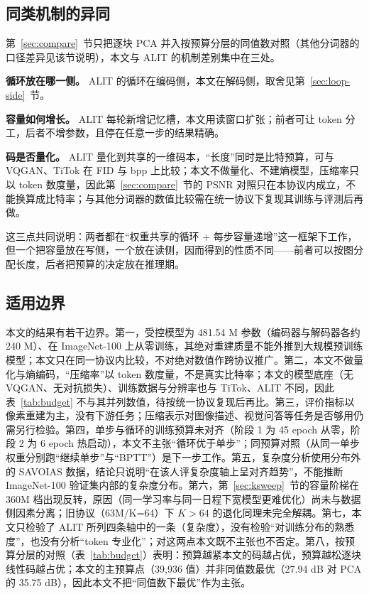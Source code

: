 \subsection{\heiti 同类机制的异同}
\label{sec:alit}

第~\ref{sec:compare}~节只把逐块 PCA 并入按预算分层的同值数对照（其他分词器的口径差异见该节说明），本文与 ALIT 的机制差别集中在三处。

\textbf{循环放在哪一侧。} ALIT 的循环在编码侧，本文在解码侧，取舍见第~\ref{sec:loop-side}~节。

\textbf{容量如何增长。} ALIT 每轮新增记忆槽，本文用读窗口扩张；前者可让 token 分工，后者不增参数，且停在任意一步的结果精确。

\textbf{码是否量化。} ALIT 量化到共享的一维码本，“长度”同时是比特预算，可与 VQGAN、TiTok 在 FID 与 bpp 上比较；本文不做量化、不建熵模型，压缩率只以 token 数度量，因此第~\ref{sec:compare}~节的 PSNR 对照只在本协议内成立，不能换算成比特率；与其他分词器的数值比较需在统一协议下复现其训练与评测后再做。

这三点共同说明：两者都在“权重共享的循环 + 每步容量递增”这一框架下工作，但一个把容量放在写侧，一个放在读侧，因而得到的性质不同——前者可以按图分配长度，后者把预算的决定放在推理期。

\subsection{\heiti 适用边界}
\label{sec:limitation}

本文的结果有若干边界。第一，受控模型为 481.54 M 参数（编码器与解码器各约 240 M）、在 ImageNet-100 上从零训练，其绝对重建质量不能外推到大规模预训练模型；本文只在同一协议内比较，不对绝对数值作跨协议推广。第二，本文不做量化与熵编码，“压缩率”以 token 数度量，不是真实比特率；本文的模型底座（无 VQGAN、无对抗损失）、训练数据与分辨率也与 TiTok、ALIT 不同，因此表~\ref{tab:budget} 不与其并列数值，待按统一协议复现后再比。第三，评价指标以像素重建为主，没有下游任务；压缩表示对图像描述、视觉问答等任务是否够用仍需另行检验。第四，单步与循环的训练预算未对齐（阶段 1 为 45 epoch 从零，阶段 2 为 6 epoch 热启动），本文不主张“循环优于单步”；同预算对照（从同一单步权重分别跑“继续单步”与“BPTT”）是下一步工作。第五，复杂度分析使用分布外的 SAVOIAS 数据，结论只说明“在该人评复杂度轴上呈对齐趋势”，不能推断 ImageNet-100 验证集内部的复杂度分布。第六，第~\ref{sec:ksweep}~节的容量阶梯在 360M 档出现反转，原因（同一学习率与同一日程下宽模型更难优化）尚未与数据侧因素分离；旧协议（63M/K=64）下 $K>64$ 的退化同理未完全解耦。第七，本文只检验了 ALIT 所列四条轴中的一条（复杂度），没有检验“对训练分布的熟悉度”，也没有分析“token 专业化”；对这两点本文既不主张也不否定。第八，按预算分层的对照（表~\ref{tab:budget}）表明：预算越紧本文的码越占优，预算越松逐块线性码越占优；本文的主预算点（39{,}936 值）并非同值数最优（27.94 dB 对 PCA 的 35.75 dB），因此本文不把“同值数下最优”作为主张。

